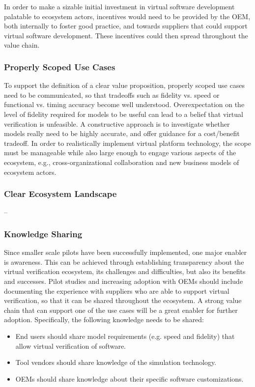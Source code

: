 In order to make a sizable initial investment in virtual software development palatable to ecosystem actors,
incentives would need to be provided by the OEM,
both internally to foster good practice, and towards suppliers that could support virtual software development.
These incentives could then spread throughout the value chain.

\subsubsection*{Properly Scoped Use Cases}
To support the definition of a clear value proposition,
properly scoped use cases need to be communicated, so that tradeoffs such as fidelity vs. speed or functional vs. timing accuracy become well understood.
Overexpectation on the level of fidelity required for models to be useful can lead to a belief that virtual verification is unfeasible.
A constructive approach is to investigate whether models really need to be highly accurate, and offer guidance for a cost/benefit tradeoff.
In order to realistically implement virtual platform technology,
the scope must be manageable
while also large enough to engage various aspects of the ecosystem,
e.g., cross-organizational collaboration and new business models of ecosystem actors.

\subsubsection*{Clear Ecosystem Landscape}
-- %

\subsubsection*{Knowledge Sharing}
Since smaller scale pilots have been successfully implemented, one major enabler is awareness.
This can be achieved through establishing transparency about the virtual verification ecosystem, its challenges and difficulties, but also its benefits and successes. 
Pilot studies and increasing adoption with OEMs should include documenting the experience with suppliers who are able to support virtual verification,
so that it can be shared throughout the ecosystem.
A strong value chain that can support one of the use cases will be a great enabler for further adoption.
Specifically, the following knowledge needs to be shared:
\begin{itemize}
  \item End users should share model requirements (e.g. speed and fidelity) that allow virtual verification of software.
  \item Tool vendors should share knowledge of the simulation technology.
  \item OEMs should share knowledge about their specific software customizations.
\end{itemize}